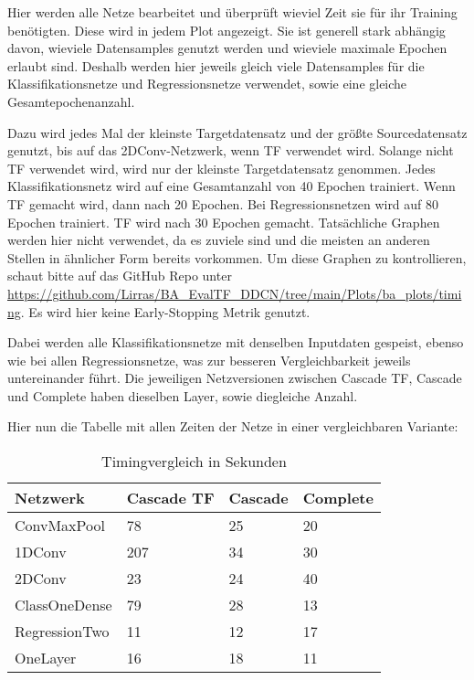 Hier werden alle Netze bearbeitet und überprüft wieviel Zeit sie für ihr Training benötigten. 
Diese wird in jedem Plot angezeigt. Sie ist generell stark abhängig davon, wieviele Datensamples genutzt werden und 
wieviele maximale Epochen erlaubt sind. Deshalb werden hier jeweils gleich viele Datensamples für die Klassifikationsnetze und 
Regressionsnetze verwendet, sowie eine gleiche Gesamtepochenanzahl. 

Dazu wird jedes Mal der kleinste Targetdatensatz und der größte Sourcedatensatz genutzt, bis auf das 2DConv-Netzwerk, wenn TF verwendet wird. 
Solange nicht TF verwendet wird, wird nur der kleinste Targetdatensatz genommen. Jedes Klassifikationsnetz 
wird auf eine Gesamtanzahl von 40 Epochen trainiert. Wenn TF gemacht wird, dann nach 20 Epochen. Bei Regressionsnetzen wird auf 80 Epochen 
trainiert. TF wird nach 30 Epochen gemacht. Tatsächliche Graphen werden hier nicht verwendet, da es zuviele sind und die meisten an 
anderen Stellen in ähnlicher Form bereits vorkommen. Um diese Graphen zu kontrollieren, schaut bitte auf das GitHub Repo unter 
\url{https://github.com/Lirras/BA_EvalTF_DDCN/tree/main/Plots/ba_plots/timing}. 
Es wird hier keine Early-Stopping Metrik genutzt. 

Dabei werden alle Klassifikationsnetze mit denselben Inputdaten gespeist, ebenso wie bei allen Regressionsnetze, was zur besseren 
Vergleichbarkeit jeweils untereinander führt. 
Die jeweiligen Netzversionen zwischen Cascade TF, Cascade und Complete haben dieselben Layer, sowie diegleiche Anzahl. 

Hier nun die Tabelle mit allen Zeiten der Netze in einer vergleichbaren Variante: \newline

\begin{table}[h!]
    \begin{center}
        \caption{Timingvergleich in Sekunden}
        \label{tab:time}
        \begin{tabular}{l|l|l|l}
            \textbf{Netzwerk} & \textbf{Cascade TF} & \textbf{Cascade} & \textbf{Complete} \\
            \hline
            ConvMaxPool & 78 & 25 & 20 \\
            1DConv & 207 & 34 & 30 \\
            2DConv & 23 & 24 & 40 \\
            ClassOneDense & 79 & 28 & 13 \\
            RegressionTwo & 11 & 12 & 17 \\
            OneLayer & 16 & 18 & 11
        \end{tabular}
    \end{center}
\end{table}

